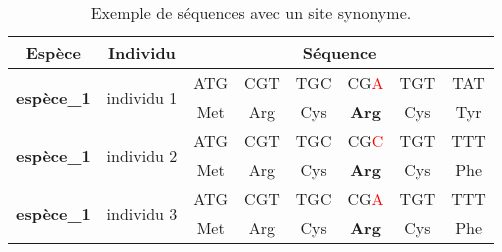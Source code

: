 \documentclass[../main]{subfiles} %
\begin{document}


\begin{table}[]
    \centering
    \begin{tabular}{cccccccc}
        \toprule
        \textbf{Espèce}                     & \textbf{Individu}             & \multicolumn{6}{c}{\textbf{Séquence}} \\
        \midrule
        \multirow{2}{*}{\textbf{espèce\_1}} & \multirow{2}{*}{individu 1}   & ATG  & CGT  & TGC  & CG\textcolor{red}{A}  & TGT & TAT \\
                                            &                               & Met  & Arg  & Cys  & \textbf{Arg}  & Cys  & Tyr \\
        \midrule
        \multirow{2}{*}{\textbf{espèce\_1}} & \multirow{2}{*}{individu 2}   & ATG  & CGT  & TGC  & CG\textcolor{red}{C}  & TGT & TTT \\
                                            &                               & Met  & Arg  & Cys  & \textbf{Arg}  & Cys  & Phe \\
        \midrule
        \multirow{2}{*}{\textbf{espèce\_1}} & \multirow{2}{*}{individu 3}   & ATG  & CGT  & TGC  & CG\textcolor{red}{A}  & TGT & TTT \\
                                            &                               & Met  & Arg  & Cys  & \textbf{Arg}  & Cys  & Phe \\
        \bottomrule
    \end{tabular}


    \scriptsize \caption{Exemple de séquences avec un site synonyme.}
    \label{tab:seqEx2}
\end{table}
\end{document}
